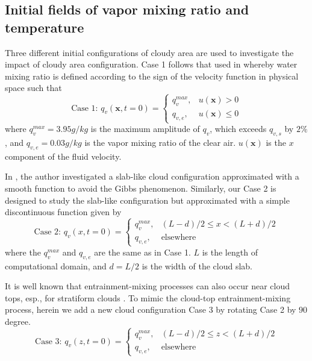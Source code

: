 \documentclass[draft,linenumbers]{AGUJournal}
\begin{document}
\subsection{Initial fields of vapor mixing ratio and temperature}
Three different initial configurations of cloudy area are used to investigate the impact of cloudy area configuration. Case 1 follows that used in \citet{And04} whereby water mixing ratio is defined according to the sign of the velocity function in physical space such that
\begin{equation}
\mbox{Case 1: } q_v(\mathbf{x},t=0) = 
\left\{\begin{array}{lr}
q_v^{max}, & u(\mathbf{x}) > 0\\
q_{v,e}, & u(\mathbf{x}) \le 0
\end{array}\right.\label{case1}
\end{equation}
where $q_v^{max} = 3.95 g/kg$ is the maximum amplitude of $q_v$, which exceeds $q_{v,s}$ by $2\%$, and $q_{v,e} = 0.03g/kg$ is the vapor mixing ratio of the clear air. $u(\mathbf{x})$ is the $x$ component of the fluid velocity. 

In \citet{Kumar11}, the author investigated a slab-like cloud configuration approximated with a smooth function to avoid the Gibbs phenomenon. Similarly, our Case 2 is designed to study the slab-like configuration but approximated with a simple discontinuous function given by
\begin{equation}
\mbox{Case 2: } q_v(x,t=0) = 
\left\{\begin{array}{lr}
q_v^{max}, & (L-d)/2 \le x < (L+d)/2\\
q_{v,e}, & \mbox{elsewhere}
\end{array}\right.\label{case2}
\end{equation}
where the $q_v^{max}$ and $q_{v,e}$ are the same as in Case 1.
$L$ is the length of computational domain, and $d = L/2$ is the width of the cloud slab.

It is well known that entrainment-mixing processes can also occur near cloud tops, esp., for stratiform clouds \citep{Lu2011, Yum2015}. To mimic the cloud-top entrainment-mixing process, herein we add a new cloud configuration Case 3 by rotating Case 2 by $90$ degree.
\begin{equation}
\mbox{Case 3: } q_v(z,t=0) = 
\left\{\begin{array}{lr}
q_v^{max}, & (L-d)/2 \le z < (L+d)/2\\
q_{v,e}, & \mbox{elsewhere}
\end{array}\right.\label{case3}
\end{equation}
\end{document}
